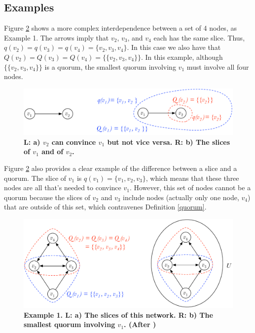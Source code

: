 \subsection{Examples}
Figure \ref{fig:example1} shows a more complex interdependence between a set of 4 nodes, as Example 1. The arrows imply that $v_2$, $v_3$, and $v_4$ each has the same slice. Thus, $q(v_2) = q(v_3) = q(v_4) = \{ v_2, v_3, v_4 \}$. In this case we also have that $Q(v_2) = Q(v_3) = Q(v_4) = \{\{ v_2, v_3, v_4 \} \}$. In this example, although $\{\{ v_2, v_3, v_4 \} \}$ is a quorum, the smallest quorum involving $v_1$ must involve all four nodes.

\begin{figure}[H]
\centering
\includegraphics[width=15 cm]{Figures/convincing}
\caption{\bf \small L: a) $v_2$ can convince $v_1$ but not vice versa. R: b) The slices of $v_1$ and of $v_2$.}
\label{fig:convincing}
\end{figure}

Figure \ref{fig:example1} also provides a clear example of the difference between a slice and a quorum. The slice of $v_1$ is $q(v_1) = \{ v_1, v_2, v_3 \}$, which means that these three nodes are all that's needed to convince $v_1$. However, this set of nodes cannot be a quorum because the slices of $v_2$ and $v_3$ include nodes (actually only one node, $v_4$) that are outside of this set, which contravenes Definition \ref{quorum}.

\begin{figure}[h]
\centering
\includegraphics[width=15 cm]{Figures/example1}
\caption{\bf \small Example 1. L: a) The slices of this network. R: b) The smallest quorum involving $v_1$. (After \cite{Mazieres2016})}
\label{fig:example1}
\end{figure}

